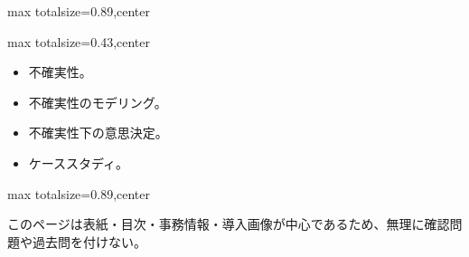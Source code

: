 \begin{minipage}[t]{0.58\textwidth}
\begin{adjustbox}{max totalsize={\textwidth}{0.89\textheight},center}
\begin{minipage}{\textwidth}
\end{minipage}
\end{adjustbox}
\end{minipage}


\clearpage
{}
\begin{minipage}[t]{0.405\textwidth}
\begin{adjustbox}{max totalsize={\textwidth}{0.43\textheight},center}
\begin{minipage}{\textwidth}\scriptsize
{}\begin{itemize}
\item 不確実性。
\item 不確実性のモデリング。
\item 不確実性下の意思決定。
\item ケーススタディ。
\end{itemize}
\end{minipage}
\end{adjustbox}
\end{minipage}\hfill
\begin{minipage}[t]{0.58\textwidth}
\begin{adjustbox}{max totalsize={\textwidth}{0.89\textheight},center}
\begin{minipage}{\textwidth}\scriptsize
{}このページは表紙・目次・事務情報・導入画像が中心であるため、無理に確認問題や過去問を付けない。
\end{minipage}
\end{adjustbox}
\end{minipage}



